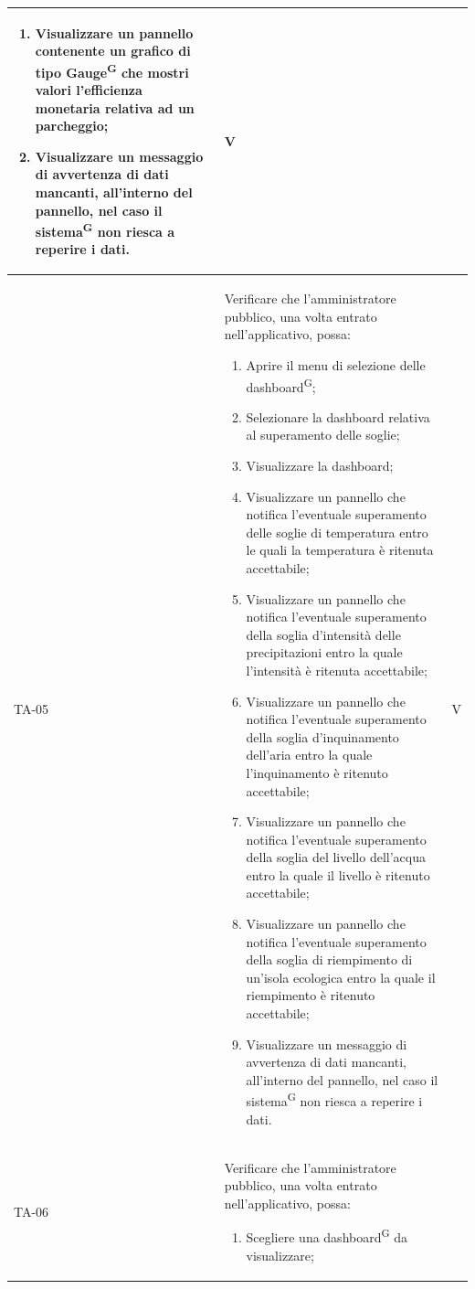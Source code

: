 \documentclass[8pt]{article}
\newcommand{\glossterm}[1]{#1\textsuperscript{G}} %
\begin{document}
\begin{longtable}{|>{\centering}p{2cm}|>{\RaggedRight}m{12cm}|>{\centering\arraybackslash}p{2cm}|}
\begin{enumerate}
        \item Visualizzare un pannello contenente un grafico di tipo \glossterm{Gauge} che mostri valori l'efficienza monetaria relativa ad un parcheggio;
        \item Visualizzare un messaggio di avvertenza di dati mancanti, all’interno del pannello, nel caso il \glossterm{sistema} non riesca a reperire i dati.
    \end{enumerate}
    & V \\
    \hline
    TA-05 & Verificare che l'amministratore pubblico, una volta entrato nell'applicativo, possa:
    \begin{enumerate}
        \setlength\itemsep{0em}
        \item Aprire il menu di selezione delle \glossterm{dashboard};
        \item Selezionare la dashboard relativa al superamento delle soglie;
        \item Visualizzare la dashboard;
        \item Visualizzare un pannello che notifica l'eventuale superamento delle soglie di temperatura entro le quali la temperatura è ritenuta accettabile;
        \item Visualizzare un pannello che notifica l'eventuale superamento della soglia d'intensità delle precipitazioni entro la quale l'intensità è ritenuta accettabile;
        \item Visualizzare un pannello che notifica l'eventuale superamento della soglia d'inquinamento dell'aria entro la quale l'inquinamento è ritenuto accettabile;
        \item Visualizzare un pannello che notifica l'eventuale superamento della soglia del livello dell'acqua entro la quale il livello è ritenuto accettabile;
        \item Visualizzare un pannello che notifica l'eventuale superamento della soglia di riempimento di un'isola ecologica entro la quale il riempimento è ritenuto accettabile;
        \item Visualizzare un messaggio di avvertenza di dati mancanti, all’interno del pannello, nel caso il \glossterm{sistema} non riesca a reperire i dati.
    \end{enumerate}
    & V \\
    \hline
    TA-06 & Verificare che l'amministratore pubblico, una volta entrato nell’applicativo, possa:
    \begin{enumerate}
        \item Scegliere una \glossterm{dashboard} da visualizzare;

\end{enumerate}
\end{longtable}
\end{document}
